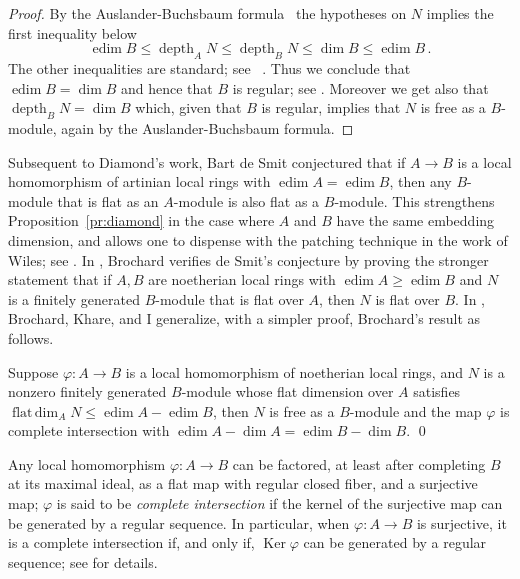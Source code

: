 \documentclass[twoside,leqno]{article}
\newcommand{\depth}{\operatorname{depth}}
\newcommand{\edim}{\operatorname{edim}}
\newcommand{\fdim}{\operatorname{flat\,dim}}
\newcommand{\Ker}{\operatorname{Ker}}
\begin{document}
\begin{proof}
By the Auslander-Buchsbaum formula~\cite[Theorem~1.3.3]{Bruns/Herzog:1998a} the hypotheses on $N$ implies the first inequality below
\[
\edim B \le \depth_A N \le \depth_B N \le \dim B\le\edim B\,.
\]
The other inequalities are standard; see ~\cite[\S1.2]{Bruns/Herzog:1998a}. Thus we conclude that $\edim B=\dim B$ and hence that $B$ is regular; see \cite[\S2.2]{Bruns/Herzog:1998a}. Moreover we get also that $\depth_BN=\dim B$ which, given that $B$ is regular, implies that $N$ is free as a $B$-module, again by the Auslander-Buchsbaum formula.
\end{proof}

Subsequent to Diamond's work, Bart de Smit conjectured that   if $A\to B$ is a local homomorphism of artinian local rings with $\edim A=\edim B$, then any $B$-module that is flat as an $A$-module is also  flat as a $B$-module. This strengthens Proposition~\ref{pr:diamond} in the case where $A$ and $B$ have the same embedding dimension, and allows one to dispense with the patching technique in the work of Wiles; see \cite[\S3]{Brochard:2017}.  In \cite[Theorem 1.1]{Brochard:2017}, Brochard verifies de Smit's conjecture by proving the stronger statement that if  $A,B$ are noetherian local rings with $\edim A\ge \edim B$  and $N$ is a  finitely generated $B$-module that is  flat over $A$,  then $N$ is flat over $B$. In   \cite{Brochard/Iyengar/Khare:2023a}, Brochard, Khare, and I generalize, with a simpler proof, Brochard's result as follows.

\begin{theorem}
\label{th:de-smit-general}
Suppose  $\varphi\colon A\to B$ is a local homomorphism of noetherian local rings, and $N$ is a nonzero finitely generated $B$-module whose flat dimension over $A$ satisfies $\fdim_AN\le \edim A-\edim B$, then $N$ is free as a $B$-module and the map $\varphi$ is  complete intersection with $\edim A - \dim A= \edim B -  \dim B$. \qed
\end{theorem}

Any local homomorphism $\varphi\colon A\to B$ can be factored, at least after completing $B$ at its maximal ideal, as a flat map with regular closed fiber, and a surjective map;  $\varphi$ is said to be \emph{complete intersection} if the kernel of the surjective map can be generated by a regular sequence. In particular,  when $\varphi\colon A\to B$ is surjective, it is a complete intersection if, and only if,  $\Ker\varphi$ can be generated by a regular sequence; see \cite[\S5]{Avramov:1999a} for details. 
\end{document}

